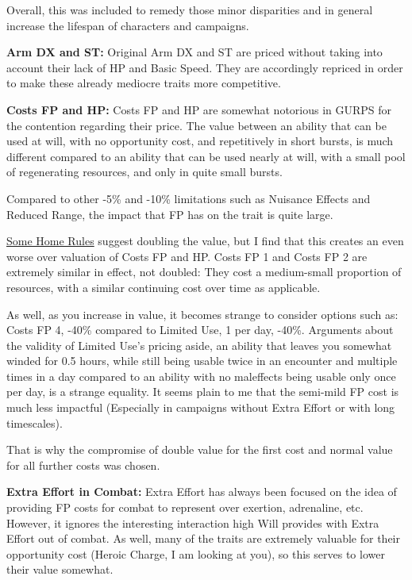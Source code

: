 \begin{multicols*}{2}
	Overall, this was included to remedy those minor disparities and in general increase the lifespan of characters and campaigns.
	
	\textbf{Arm DX and ST:} Original Arm DX and ST are priced without taking into account their lack of HP and Basic Speed. They are accordingly repriced in order to make these already mediocre traits more competitive.
	
	\textbf{Costs FP and HP:} Costs FP and HP are somewhat notorious in GURPS for the contention regarding their price. The value between an ability that can be used at will, with no opportunity cost, and repetitively in short bursts, is much different compared to an ability that can be used nearly at will, with a small pool of regenerating resources, and only in quite small bursts.
	
	Compared to other -5\% and -10\% limitations such as Nuisance Effects and Reduced Range, the impact that FP has on the trait is quite large.
	
	\textcolor{Blue}{\href{http://www.mygurps.com/index.php?n=Main.GURPSHouseRules}{Some Home Rules}} suggest doubling the value, but I find that this creates an even worse over valuation of Costs FP and HP. Costs FP 1 and Costs FP 2 are extremely similar in effect, not doubled: They cost a medium-small proportion of resources, with a similar continuing cost over time as applicable. 
	
	As well, as you increase in value, it becomes strange to consider options such as: Costs FP 4, -40\% compared to Limited Use, 1 per day, -40\%. Arguments about the validity of Limited Use's pricing aside, an ability that leaves you somewhat winded for 0.5 hours, while still being usable twice in an encounter and multiple times in a day compared to an ability with no maleffects being usable only once per day, is a strange equality. It seems plain to me that the semi-mild FP cost is much less impactful (Especially in campaigns without Extra Effort or with long timescales).
	
	That is why the compromise of double value for the first cost and normal value for all further costs was chosen. 
	
	\textbf{Extra Effort in Combat:} Extra Effort has always been focused on the idea of providing FP costs for combat to represent over exertion, adrenaline, etc. However, it ignores the interesting interaction high Will provides with Extra Effort out of combat. As well, many of the traits are extremely valuable for their opportunity cost (Heroic Charge, I am looking at you), so this serves to lower their value somewhat.
	

\end{multicols*}
